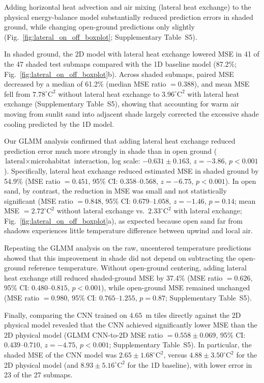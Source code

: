 \documentclass[12pt]{article}
\begin{document}
\noindent Adding horizontal heat advection and air mixing (lateral heat exchange) to the physical energy-balance model substantially reduced prediction errors in shaded ground, while changing open-ground predictions only slightly (Fig.~\ref{fig:lateral_on_off_boxplot}; Supplementary Table~S5).

In shaded ground, the 2D model with lateral heat exchange lowered MSE in 41 of the 47 shaded test submaps compared with the 1D baseline model (87.2\%; Fig.~\ref{fig:lateral_on_off_boxplot}b). Across shaded submaps, paired MSE decreased by a median of 61.2\% (median MSE ratio $= 0.388$), and mean MSE fell from $7.78^{\circ}\mathrm{C}^2$ without lateral heat exchange to $3.96^{\circ}\mathrm{C}^2$ with lateral heat exchange (Supplementary Table~S5), showing that accounting for warm air moving from sunlit sand into adjacent shade largely corrected the excessive shade cooling predicted by the 1D model.

Our GLMM analysis confirmed that adding lateral heat exchange reduced prediction error much more strongly in shade than in open ground ($\text{lateral} \times \text{microhabitat}$ interaction, log scale: $-0.631 \pm 0.163$, $z = -3.86$, $p < 0.001$). Specifically, lateral heat exchange reduced estimated MSE in shaded ground by 54.9\% (MSE ratio $= 0.451$, 95\% CI: $0.358$--$0.568$, $z = -6.75$, $p < 0.001$). In open sand, by contrast, the reduction in MSE was small and not statistically significant (MSE ratio $= 0.848$, 95\% CI: $0.679$--$1.058$, $z = -1.46$, $p = 0.14$; mean MSE $= 2.72^{\circ}\mathrm{C}^2$ without lateral exchange vs.\ $2.33^{\circ}\mathrm{C}^2$ with lateral exchange; Fig.~\ref{fig:lateral_on_off_boxplot}a), as expected because open sand far from shadows experiences little temperature difference between upwind and local air.

Repeating the GLMM analysis on the raw, uncentered temperature predictions showed that this improvement in shade did not depend on subtracting the open-ground reference temperature. Without open-ground centering, adding lateral heat exchange still reduced shaded-ground MSE by 37.4\% (MSE ratio $= 0.626$, 95\% CI: $0.480$--$0.815$, $p < 0.001$), while open-ground MSE remained unchanged (MSE ratio $= 0.980$, 95\% CI: $0.765$--$1.255$, $p = 0.87$; Supplementary Table~S5).

Finally, comparing the CNN trained on $4.65$~m tiles directly against the 2D physical model revealed that the CNN achieved significantly lower MSE than the 2D physical model (GLMM CNN-to-2D MSE ratio $= 0.558 \pm 0.069$, 95\% CI: $0.439$--$0.710$, $z = -4.75$, $p < 0.001$; Supplementary Table~S5). In particular, the shaded MSE of the CNN model was $2.65 \pm 1.68^{\circ}\mathrm{C}^2$, versus $4.88 \pm 3.50^{\circ}\mathrm{C}^2$ for the 2D physical model (and $8.93 \pm 5.16^{\circ}\mathrm{C}^2$ for the 1D baseline), with lower error in 23 of the 27 submaps.
\end{document}
